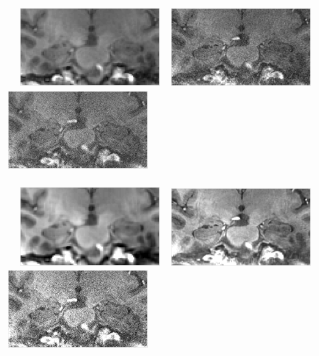\documentclass[]{article}
\begin{document}
\begin{figure}
	~
	{\includegraphics[width=0.33\textwidth]{noisy5025_200_x.pdf}}~
	{\includegraphics[width=0.33\textwidth]{noisy5025_400_x.pdf}}~
	{\includegraphics[width=0.33\textwidth]{noisy5025_700_x.pdf}}~\\
	\vspace{-1em}
	
	~
	{\includegraphics[width=0.33\textwidth]{denoised5025_200_x.pdf}}~
	{\includegraphics[width=0.33\textwidth]{denoised5025_400_x.pdf}}~
	{\includegraphics[width=0.33\textwidth]{denoised5025_700_x.pdf}}~\\
	\vspace{-1em}
	

\end{figure}
\end{document}
